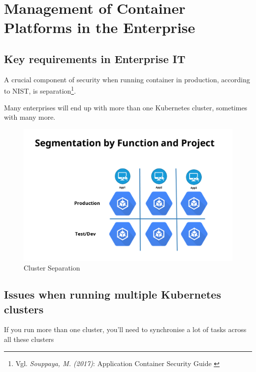 %
%

\pagebreak
\section{Management of Container Platforms in the Enterprise}

\onehalfspacing

\subsection{Key requirements in Enterprise IT}

A crucial component of security when running container in production, according to NIST, is separation\footnote{Vgl. \textit{Souppaya, M. (2017)}: Application Container Security Guide \cite{sp800-190}}.

Many enterprises will end up with more than one Kubernetes cluster, sometimes with many more.

\begin{figure}[h]
\centering
\includegraphics[width=\linewidth]{images/separation}
\caption {Cluster Separation}
\label{fig:clusterSeparation}
\end{figure}

\subsection{Issues when running multiple Kubernetes clusters}

If you run more than one cluster, you'll need to synchronise a lot of tasks across all these clusters

